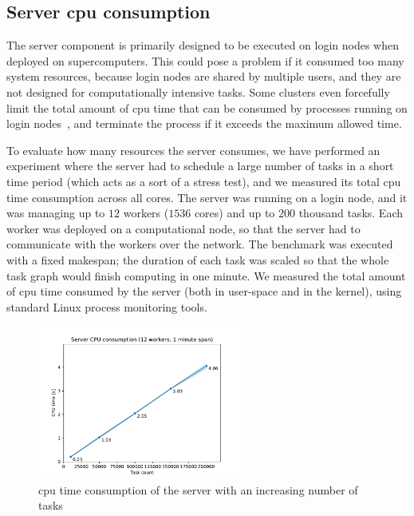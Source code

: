 \subsection{Server \acrshort{cpu} consumption}
\label{sec:hq-exp-server-cpu-consumption}
The \hyperqueue{} server component is primarily designed to be executed on login nodes
when deployed on supercomputers. This could pose a problem if it consumed too many system
resources, because login nodes are shared by multiple users, and they are not designed for
computationally intensive tasks. Some clusters even forcefully limit the total amount of
\gls{cpu} time that can be consumed by processes running on login
nodes~\cite{leonardo_time_limit}, and terminate the process if it exceeds the maximum allowed time.

To evaluate how many resources the server consumes, we have performed an experiment where the
server had to schedule a large number of tasks in a short time period (which acts as a sort of a
stress test), and we measured its total \gls{cpu} time consumption across all cores.
The server was running on a login node, and it was managing up to $12$ workers
($1536$ cores) and up to $200$ thousand tasks. Each worker was
deployed on a computational node, so that the server had to communicate with the workers over the
network. The benchmark was executed with a fixed makespan; the duration of each task was scaled so
that the whole task graph would finish computing in one minute. We measured the total amount of
\gls{cpu} time consumed by the server (both in user-space and in the kernel), using
standard Linux process monitoring tools.

\begin{figure}[h]
	\centering
	\includegraphics[width=0.6\textwidth]{imgs/hq/charts/server-utilization-tasks}
	\caption{\acrshort{cpu} time consumption of the \hyperqueue{} server with an increasing
	number of tasks}
	\label{fig:hq-server-cpu-consumption-tasks}
\end{figure}

